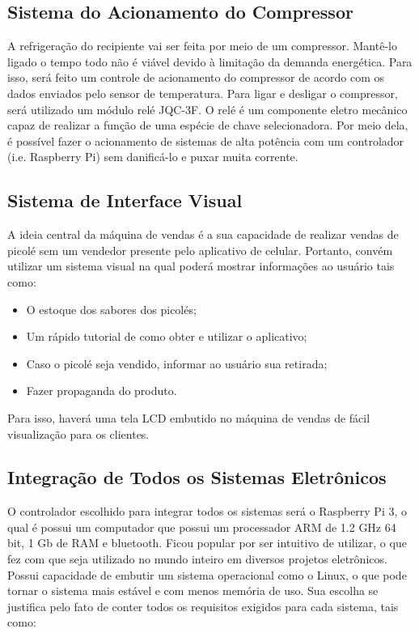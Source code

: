 \subsection{Sistema do Acionamento do Compressor}

A refrigeração do recipiente vai ser feita por meio de um compressor. Mantê-lo ligado o tempo todo não é viável devido à limitação da demanda energética. Para isso, será feito um controle de acionamento do compressor de acordo com os dados enviados pelo sensor de temperatura. Para ligar e desligar o compressor, será utilizado um módulo relé JQC-3F. O relé é um componente eletro mecânico capaz de realizar a função de uma espécie de chave selecionadora. Por meio dela, é possível fazer o acionamento de sistemas de alta potência com um controlador (i.e. Raspberry Pi) sem danificá-lo e puxar muita corrente.

\subsection{Sistema de Interface Visual}

A ideia central da máquina de vendas é a sua capacidade de realizar vendas de picolé sem um vendedor presente pelo aplicativo de celular. Portanto, convém utilizar um sistema visual na qual poderá mostrar informações ao usuário tais como:

\begin{itemize}
  \item O estoque dos sabores dos picolés;
  \item Um rápido tutorial de como obter e utilizar o aplicativo;
  \item Caso o picolé seja vendido, informar ao usuário sua retirada;
  \item Fazer propaganda do produto.
\end{itemize}

Para isso, haverá uma tela LCD embutido no máquina de vendas de fácil visualização para os clientes.

\subsection{Integração de Todos os Sistemas Eletrônicos}

O controlador escolhido para integrar todos os sistemas será o Raspberry Pi 3, o qual é possui um computador que possui um processador ARM de 1.2 GHz 64 bit, 1 Gb de RAM e bluetooth. Ficou popular por ser intuitivo de utilizar, o que fez com que seja utilizado no mundo inteiro em diversos projetos eletrônicos. Possui capacidade de embutir um sistema operacional como o Linux, o que pode tornar o sistema mais estável e com menos memória de uso. Sua escolha se justifica pelo fato de conter todos os requisitos exigidos para cada sistema, tais como:

